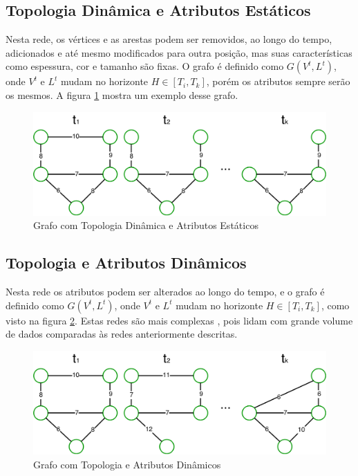 \subsection{Topologia Dinâmica e Atributos Estáticos}
\label{subsec:topdinatribest}
Nesta rede, os vértices e as arestas podem ser removidos, ao longo do tempo, adicionados e até mesmo
modificados para outra posição, mas suas características como espessura, cor e tamanho são fixas.
O grafo é definido como $G(V^t, L^t)$, onde $V^t$ e $L^t$ mudam no horizonte $H \in [T_i, T_k]$,
porém os atributos sempre serão os mesmos. A figura \ref{fig:tdae} mostra um exemplo desse grafo.

\begin{figure}[htbp]
\centering
 \includegraphics[width=.80\textwidth]{chapters/fig/tdae.png}
\caption{Grafo com Topologia Dinâmica e Atributos Estáticos}
\label{fig:tdae}
\end{figure}

\FloatBarrier

\subsection{Topologia e Atributos Dinâmicos}
\label{subsec:topdinatridin}
Nesta rede os atributos podem ser alterados ao longo do tempo, e o grafo é definido como $G(V^t, L^t)$,
onde $V^t$ e $L^t$ mudam no horizonte $H \in [T_i, T_k]$, como visto na figura \ref{fig:tdad}.
Estas redes são mais complexas \cite{dynagraph}, pois lidam com grande volume de dados comparadas às redes anteriormente descritas.

\begin{figure}[htbp]
\centering
 \includegraphics[width=.80\textwidth]{chapters/fig/tdad.png}
\caption{Grafo com Topologia e Atributos Dinâmicos}
\label{fig:tdad}
\end{figure}

